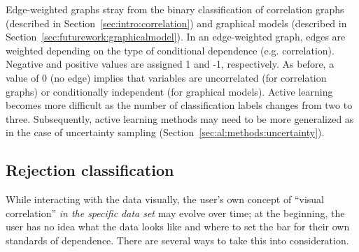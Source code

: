 Edge-weighted graphs stray from the binary classification of 
correlation graphs (described in Section~\ref{sec:intro:correlation}) and 
graphical models (described in Section~\ref{sec:futurework:graphicalmodel}). In 
an edge-weighted graph, edges are weighted depending
on the type of conditional dependence (e.g. correlation). Negative and positive 
values are assigned 1 and -1, respectively. As before, a value of 0 (no edge) 
implies that variables are uncorrelated (for correlation graphs) or 
conditionally independent (for graphical models). Active learning becomes 
more difficult as the number of classification labels changes from two to 
three. Subsequently, active learning methods may need to be more generalized as 
in the case of uncertainty sampling (Section~\ref{sec:al:methods:uncertainty}). 

\subsection{Rejection classification}
\label{sec:futurework:rejection}

While interacting with the data visually, the user's own concept of ``visual 
correlation'' \textit{in the specific data set} may evolve over time; at the 
beginning, the user has no idea what the data looks like and where to set the 
bar for their own standards of dependence. There are several 
ways to take this into consideration. 

